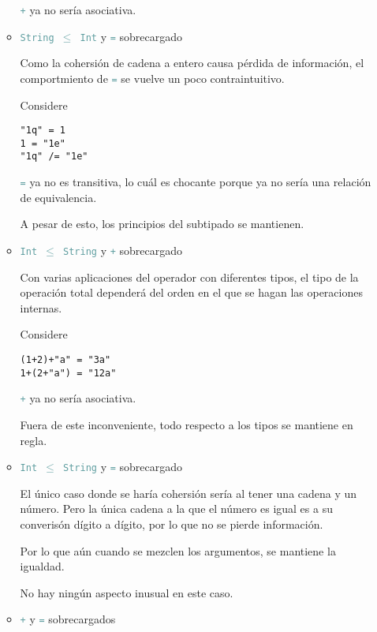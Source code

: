 \documentclass{article}
\newcommand{\tp}[1]{\textcolor{CadetBlue} {\texttt{#1}}}
\begin{document}
\begin{enumerate}
\begin{itemize}
            \tp{+} ya no sería asociativa.

            \item \tp{String $\leq$ Int} y \tp{=} sobrecargado

            Como la cohersión de cadena a entero causa pérdida de información,
            el comportmiento de \tp{=} se vuelve un poco contraintuitivo.

            Considere

            \begin{verbatim}
"1q" = 1
1 = "1e"
"1q" /= "1e"
            \end{verbatim}

            \tp{=} ya no es transitiva, lo cuál es chocante porque ya no sería 
            una relación de equivalencia.

            A pesar de esto, los principios del  subtipado se mantienen.

            \item \tp{Int $\leq$ String} y \tp{+} sobrecargado

            Con varias aplicaciones del operador con diferentes tipos, el 
            tipo de la operación total dependerá del orden en el que se hagan
            las operaciones internas.

            Considere

            \begin{verbatim}
(1+2)+"a" = "3a"
1+(2+"a") = "12a"
            \end{verbatim}

            \tp{+} ya no sería asociativa.

            Fuera de este inconveniente, todo respecto a los tipos se mantiene
            en regla.

            \item \tp{Int $\leq$ String} y \tp{=} sobrecargado

            El único caso donde se haría cohersión sería al tener una cadena y 
            un número. Pero la única cadena a la que el número es igual es a su 
            converisón dígito a dígito, por lo que no se pierde información.

            Por lo que aún cuando se mezclen los argumentos, se mantiene la 
            igualdad.

            No hay ningún aspecto inusual en este caso.

            \item \tp{+} y \tp{=} sobrecargados


\end{itemize}
\end{enumerate}
\end{document}
